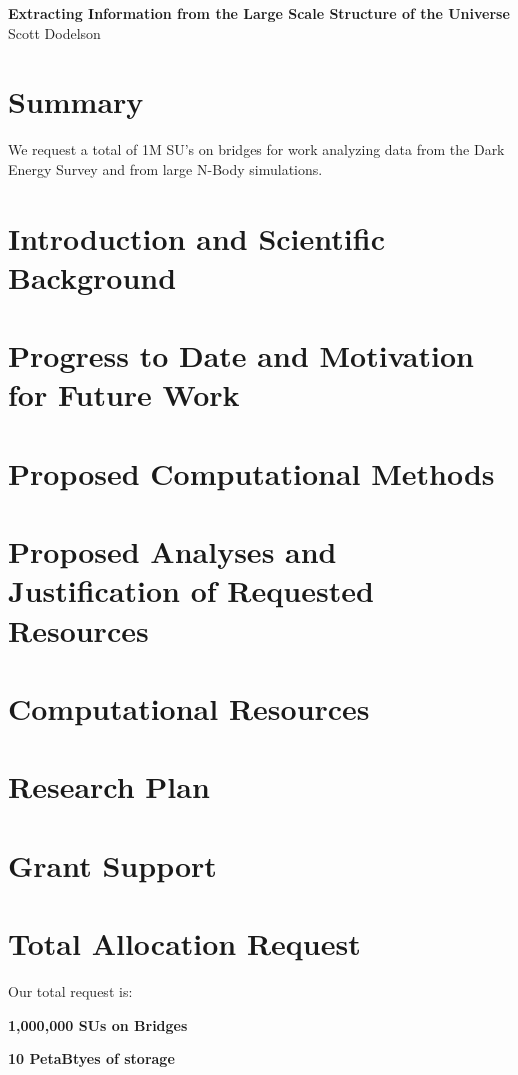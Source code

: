 \documentclass[12pt]{article}
\begin{document}
\topmargin=-2.105cm
\oddsidemargin=-0.1cm
\evensidemargin=0cm

\begin{center}
{\bf Extracting Information from the Large Scale Structure of the Universe\\}
Scott Dodelson
\end{center}

\begin{small}


\section*{Summary} We request a total of 1M SU's on bridges for work analyzing data from the Dark Energy Survey and from large N-Body simulations.

\section{Introduction and Scientific Background}

\section{Progress to Date and Motivation for Future Work}

\section{Proposed Computational Methods}

\section{Proposed Analyses and Justification of Requested Resources}

\section{Computational Resources}

\section{Research Plan}

\section{Grant Support}

\section{Total Allocation Request}

Our total request is:

{\bf 1,000,000 SUs on Bridges}

{\bf 10 PetaBtyes of storage}

\end{small}




\end{document}
